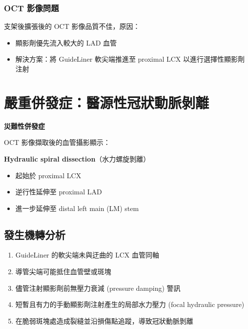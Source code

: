 \documentclass[12pt,a4paper]{article}
\begin{document}
\subsubsection{OCT 影像問題}

支架後擴張後的 OCT 影像品質不佳，原因：

\begin{itemize}
    \item 顯影劑優先流入較大的 LAD 血管
    \item 解決方案：將 GuideLiner 軟尖端推進至 proximal LCX 以進行選擇性顯影劑注射
\end{itemize}


\section{嚴重併發症：醫源性冠狀動脈剝離}

\begin{importantbox}
\textbf{災難性併發症}

OCT 影像擷取後的血管攝影顯示：

\textbf{Hydraulic spiral dissection}（水力螺旋剝離）
\begin{itemize}
    \item 起始於 proximal LCX
    \item 逆行性延伸至 proximal LAD
    \item 進一步延伸至 distal left main (LM) stem
\end{itemize}
\end{importantbox}

\subsection{發生機轉分析}

\begin{enumerate}
    \item GuideLiner 的軟尖端未與迂曲的 LCX 血管同軸
    \item 導管尖端可能抵住血管壁或斑塊
    \item 儘管注射顯影劑前無壓力衰減 (pressure damping) 警訊
    \item 短暫且有力的手動顯影劑注射產生的局部水力壓力 (focal hydraulic pressure)
    \item 在脆弱斑塊處造成裂縫並沿損傷點追蹤，導致冠狀動脈剝離
\end{enumerate}
\end{document}
